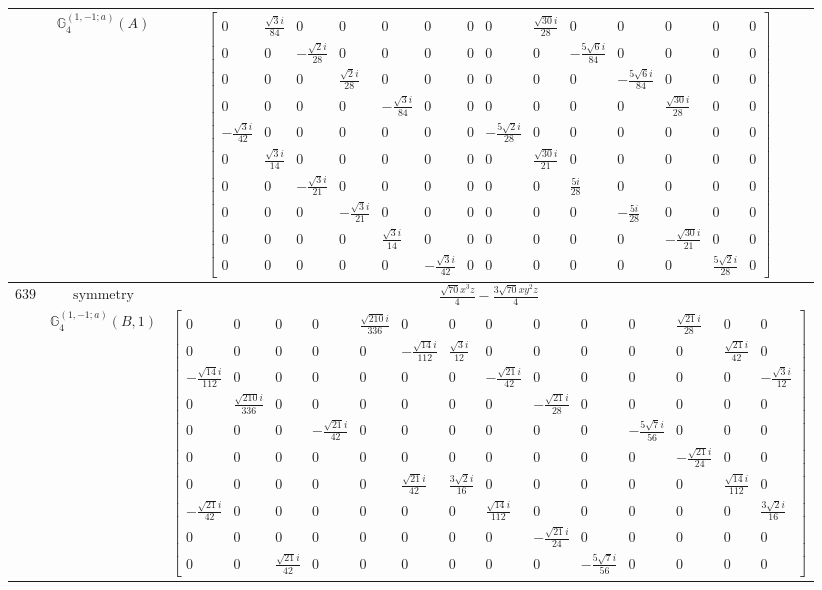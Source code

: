 \documentclass[fleqn,8pt,landscape]{jsarticle}
\begin{document}
\begin{longtable}{ccc}
$  $ & $ \mathbb{G}_{4}^{(1,-1;a)}(A) $ & $ \begin{bmatrix} 0 & \frac{\sqrt{3} i}{84} & 0 & 0 & 0 & 0 & 0 & 0 & \frac{\sqrt{30} i}{28} & 0 & 0 & 0 & 0 & 0 \\ 0 & 0 & - \frac{\sqrt{2} i}{28} & 0 & 0 & 0 & 0 & 0 & 0 & - \frac{5 \sqrt{6} i}{84} & 0 & 0 & 0 & 0 \\ 0 & 0 & 0 & \frac{\sqrt{2} i}{28} & 0 & 0 & 0 & 0 & 0 & 0 & - \frac{5 \sqrt{6} i}{84} & 0 & 0 & 0 \\ 0 & 0 & 0 & 0 & - \frac{\sqrt{3} i}{84} & 0 & 0 & 0 & 0 & 0 & 0 & \frac{\sqrt{30} i}{28} & 0 & 0 \\ - \frac{\sqrt{3} i}{42} & 0 & 0 & 0 & 0 & 0 & 0 & - \frac{5 \sqrt{2} i}{28} & 0 & 0 & 0 & 0 & 0 & 0 \\ 0 & \frac{\sqrt{3} i}{14} & 0 & 0 & 0 & 0 & 0 & 0 & \frac{\sqrt{30} i}{21} & 0 & 0 & 0 & 0 & 0 \\ 0 & 0 & - \frac{\sqrt{3} i}{21} & 0 & 0 & 0 & 0 & 0 & 0 & \frac{5 i}{28} & 0 & 0 & 0 & 0 \\ 0 & 0 & 0 & - \frac{\sqrt{3} i}{21} & 0 & 0 & 0 & 0 & 0 & 0 & - \frac{5 i}{28} & 0 & 0 & 0 \\ 0 & 0 & 0 & 0 & \frac{\sqrt{3} i}{14} & 0 & 0 & 0 & 0 & 0 & 0 & - \frac{\sqrt{30} i}{21} & 0 & 0 \\ 0 & 0 & 0 & 0 & 0 & - \frac{\sqrt{3} i}{42} & 0 & 0 & 0 & 0 & 0 & 0 & \frac{5 \sqrt{2} i}{28} & 0 \end{bmatrix} $ \\ \hline
$ 639 $ & $ \text{symmetry} $ & $ \frac{\sqrt{70} x^{3} z}{4} - \frac{3 \sqrt{70} x y^{2} z}{4} $ \\
$  $ & $ \mathbb{G}_{4}^{(1,-1;a)}(B,1) $ & $ \begin{bmatrix} 0 & 0 & 0 & 0 & \frac{\sqrt{210} i}{336} & 0 & 0 & 0 & 0 & 0 & 0 & \frac{\sqrt{21} i}{28} & 0 & 0 \\ 0 & 0 & 0 & 0 & 0 & - \frac{\sqrt{14} i}{112} & \frac{\sqrt{3} i}{12} & 0 & 0 & 0 & 0 & 0 & \frac{\sqrt{21} i}{42} & 0 \\ - \frac{\sqrt{14} i}{112} & 0 & 0 & 0 & 0 & 0 & 0 & - \frac{\sqrt{21} i}{42} & 0 & 0 & 0 & 0 & 0 & - \frac{\sqrt{3} i}{12} \\ 0 & \frac{\sqrt{210} i}{336} & 0 & 0 & 0 & 0 & 0 & 0 & - \frac{\sqrt{21} i}{28} & 0 & 0 & 0 & 0 & 0 \\ 0 & 0 & 0 & - \frac{\sqrt{21} i}{42} & 0 & 0 & 0 & 0 & 0 & 0 & - \frac{5 \sqrt{7} i}{56} & 0 & 0 & 0 \\ 0 & 0 & 0 & 0 & 0 & 0 & 0 & 0 & 0 & 0 & 0 & - \frac{\sqrt{21} i}{24} & 0 & 0 \\ 0 & 0 & 0 & 0 & 0 & \frac{\sqrt{21} i}{42} & \frac{3 \sqrt{2} i}{16} & 0 & 0 & 0 & 0 & 0 & \frac{\sqrt{14} i}{112} & 0 \\ - \frac{\sqrt{21} i}{42} & 0 & 0 & 0 & 0 & 0 & 0 & \frac{\sqrt{14} i}{112} & 0 & 0 & 0 & 0 & 0 & \frac{3 \sqrt{2} i}{16} \\ 0 & 0 & 0 & 0 & 0 & 0 & 0 & 0 & - \frac{\sqrt{21} i}{24} & 0 & 0 & 0 & 0 & 0 \\ 0 & 0 & \frac{\sqrt{21} i}{42} & 0 & 0 & 0 & 0 & 0 & 0 & - \frac{5 \sqrt{7} i}{56} & 0 & 0 & 0 & 0 \end{bmatrix} $ \\ \hline

\end{longtable}
\end{document}

